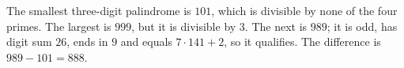 The smallest three-digit palindrome is $101$, which is divisible by none of the four primes. The largest is $999$, but it is divisible by $3$. The next is $989$; it is odd, has digit sum $26$, ends in $9$ and equals $7\cdot141+2$, so it qualifies. The difference is $989-101=\boxed{888}$.

